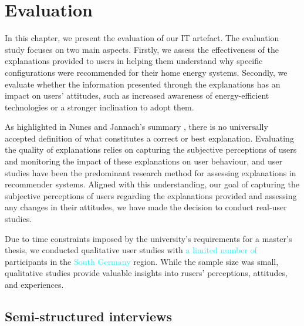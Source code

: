 \chapter{Evaluation}

In this chapter, we present the evaluation of our IT artefact. 
The evaluation study focuses on two main aspects. 
Firstly, we assess the effectiveness of the explanations provided to users in helping them understand why specific configurations were recommended for their home energy systems.
Secondly, we evaluate whether the information presented through the explanations has an impact on users' attitudes, such as increased awareness of energy-efficient technologies or a stronger inclination to adopt them. 
 
As highlighted in Nunes and Jannach's summary \cite{Nunes2020}, 
there is no universally accepted definition of what constitutes a correct or best explanation. 
Evaluating the quality of explanations relies on capturing the subjective perceptions of users and monitoring the impact of these explanations on user behaviour, 
and user studies have been the predominant research method for assessing explanations in recommender systems.
Aligned with this understanding, our goal of capturing the subjective perceptions of users regarding the explanations provided and assessing any changes in their attitudes, 
we have made the decision to conduct real-user studies. 

Due to time constraints imposed by the university's requirements for a master's thesis, we conducted qualitative user studies with \textcolor{cyan}{a limited number of} participants in the \textcolor{cyan}{South Germany} region. 
While the sample size was small, qualitative studies provide valuable insights into rusers' perceptions, attitudes, and experiences.


\section{Semi-structured interviews}

